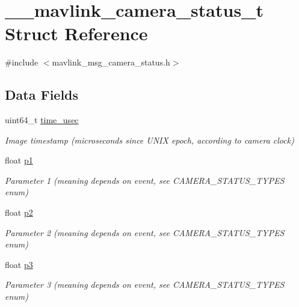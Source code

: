 \hypertarget{struct____mavlink__camera__status__t}{\section{\+\_\+\+\_\+mavlink\+\_\+camera\+\_\+status\+\_\+t Struct Reference}
\label{struct____mavlink__camera__status__t}
}


{\ttfamily \#include $<$mavlink\+\_\+msg\+\_\+camera\+\_\+status.\+h$>$}

\subsection*{Data Fields}
\begin{DoxyCompactItemize}
\item 
uint64\+\_\+t \hyperlink{struct____mavlink__camera__status__t_a12593dc20e6c4488d604b0cc3a6173d7}{time\+\_\+usec}
\begin{DoxyCompactList}\small\item\em Image timestamp (microseconds since U\+N\+I\+X epoch, according to camera clock) \end{DoxyCompactList}\item 
float \hyperlink{struct____mavlink__camera__status__t_a9f0f4d16590fffe5524c6051e5b2405d}{p1}
\begin{DoxyCompactList}\small\item\em Parameter 1 (meaning depends on event, see C\+A\+M\+E\+R\+A\+\_\+\+S\+T\+A\+T\+U\+S\+\_\+\+T\+Y\+P\+E\+S enum) \end{DoxyCompactList}\item 
float \hyperlink{struct____mavlink__camera__status__t_a03b8078bfb07bf7b94c8980cf85a020d}{p2}
\begin{DoxyCompactList}\small\item\em Parameter 2 (meaning depends on event, see C\+A\+M\+E\+R\+A\+\_\+\+S\+T\+A\+T\+U\+S\+\_\+\+T\+Y\+P\+E\+S enum) \end{DoxyCompactList}\item 
float \hyperlink{struct____mavlink__camera__status__t_a0314b46e082251d221c7c3ea10129aae}{p3}
\begin{DoxyCompactList}\small\item\em Parameter 3 (meaning depends on event, see C\+A\+M\+E\+R\+A\+\_\+\+S\+T\+A\+T\+U\+S\+\_\+\+T\+Y\+P\+E\+S enum) \end{DoxyCompactList}\item 

\end{DoxyCompactItemize}
